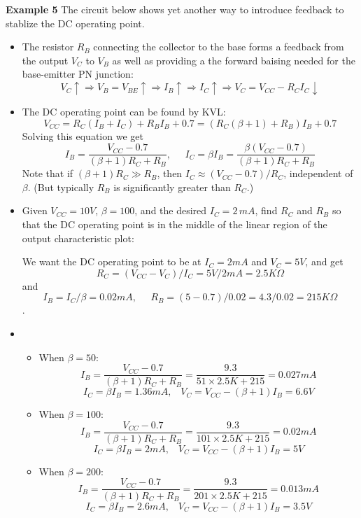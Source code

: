 \begin{itemize}
{\bf Example 5} The circuit below shows yet another way to introduce
feedback to stablize the DC operating point. 


\begin{itemize}
\item The resistor $R_B$ connecting the collector to the base forms
  a feedback from the output $V_C$ to $V_B$ as well as providing a
  the forward baising needed for the base-emitter PN junction:
  \[
  V_C \uparrow \Longrightarrow V_B=V_{BE}\uparrow\Longrightarrow I_B 
  \uparrow \Longrightarrow I_C \uparrow \Longrightarrow V_C=V_{CC}-R_CI_C \downarrow
  \]
\item The DC operating point can be found by KVL:
  \[
  V_{CC}=R_C(I_B+I_C)+R_BI_B+0.7=(R_C(\beta+1)+R_B)I_B+0.7
  \]
  Solving this equation we get
  \[ 
  I_B=\frac{V_{CC}-0.7}{(\beta+1)R_C+R_B},\;\;\;\;\;
  I_C=\beta I_B=\frac{\beta(V_{CC}-0.7)}{(\beta+1)R_C+R_B}  
  \]
  Note that if $(\beta+1)R_C \gg R_B$, then $I_C \approx (V_{CC}-0.7)/R_C$, 
  independent of $\beta$. (But typically $R_B$ is significantly greater
  than $R_C$.)
\item Given $V_{CC}=10V$, $\beta=100$, and the desired $I_C=2\,mA$, find
  $R_C$ and $R_B$ so that the DC operating point is in the middle of the 
  linear region of the output characteristic plot:
  
  We want the DC operating point to be at $I_C=2mA$ and $V_C=5V$, and
  get
  \[
  R_C=(V_{CC}-V_C)/I_C=5V/2mA=2.5K\Omega
  \]
  and
  \[
  I_B=I_C/\beta=0.02mA, \;\;\;\;\;R_B=(5-0.7)/0.02=4.3/0.02=215K\Omega
  \].
\item 
  \begin{itemize}
  \item When $\beta=50$:
    \[
    I_B=\frac{V_{CC}-0.7}{(\beta+1)R_C+R_B}=\frac{9.3}{51\times 2.5K+215}
    =0.027mA 
    \]
    \[
    I_C=\beta I_B=1.36mA,\;\;\;V_C=V_{CC}-(\beta+1)I_B=6.6V 
    \]
  \item When $\beta=100$:
    \[
    I_B=\frac{V_{CC}-0.7}{(\beta+1)R_C+R_B}=\frac{9.3}{101\times 2.5K+215}
    =0.02mA 
    \]
    \[
    I_C=\beta I_B=2 mA,\;\;\;V_C=V_{CC}-(\beta+1)I_B=5V 
    \]
  \item When $\beta=200$:
    \[
    I_B=\frac{V_{CC}-0.7}{(\beta+1)R_C+R_B}=\frac{9.3}{201\times 2.5K+215}
    =0.013mA 
    \]
    \[
    I_C=\beta I_B=2.6mA,\;\;\;V_C=V_{CC}-(\beta+1)I_B=3.5V 
    \]
  \end{itemize}
\end{itemize}



\end{itemize}
